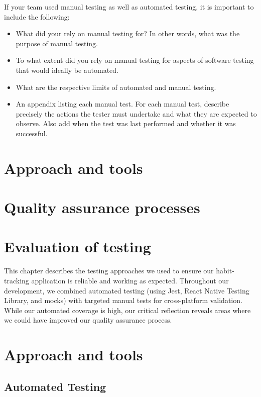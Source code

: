 \begin{expectations}
If your team used manual testing as well as automated testing, it is important to include the following:
\begin{itemize}
\item What did your rely on manual testing for?  In other words, what was the purpose of manual testing.
\item To what extent did you rely on manual testing for aspects of software testing that would ideally be automated.
\item What are the respective limits of automated and manual testing.
\item An appendix listing each manual test.  For each manual test, describe precisely the actions the tester must undertake and what they are expected to observe.  Also add when the test was last performed and whether it was successful.
\end{itemize}
\end{expectations}

\section{Approach and tools}
\label{sect:testing:approach}

\section{Quality assurance processes}
\label{sect:testing:process}

\section{Evaluation of testing}
\label{sect:testing:evaluation}


This chapter describes the testing approaches we used to ensure our habit-tracking application is reliable and working as expected. Throughout our development, we combined automated testing (using Jest, React Native Testing Library, and mocks) with targeted manual tests for cross-platform validation. While our automated coverage is high, our critical reflection reveals areas where we could have improved our quality assurance process.

\section{Approach and tools} \label{sect:testing:approach}

\subsection{Automated Testing}

